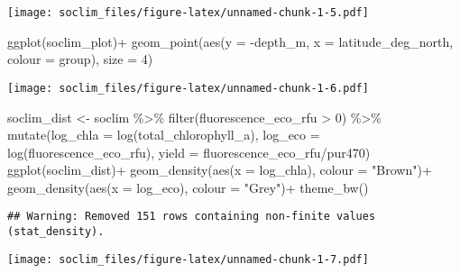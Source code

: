 \documentclass[
]{article}
\newenvironment{Shaded}{\begin{snugshade}}{\end{snugshade}}
\newcommand{\AttributeTok}[1]{\textcolor[rgb]{0.77,0.63,0.00}{#1}}
\newcommand{\DecValTok}[1]{\textcolor[rgb]{0.00,0.00,0.81}{#1}}
\newcommand{\FunctionTok}[1]{\textcolor[rgb]{0.00,0.00,0.00}{#1}}
\newcommand{\NormalTok}[1]{#1}
\newcommand{\OtherTok}[1]{\textcolor[rgb]{0.56,0.35,0.01}{#1}}
\newcommand{\SpecialCharTok}[1]{\textcolor[rgb]{0.00,0.00,0.00}{#1}}
\newcommand{\StringTok}[1]{\textcolor[rgb]{0.31,0.60,0.02}{#1}}
\begin{document}
\texttt{[image: soclim\_files/figure-latex/unnamed-chunk-1-5.pdf]}

\begin{Shaded}
\begin{Highlighting}[]
\FunctionTok{ggplot}\NormalTok{(soclim\_plot)}\SpecialCharTok{+}
  \FunctionTok{geom\_point}\NormalTok{(}\FunctionTok{aes}\NormalTok{(}\AttributeTok{y =} \SpecialCharTok{{-}}\NormalTok{depth\_m, }\AttributeTok{x =}\NormalTok{ latitude\_deg\_north, }\AttributeTok{colour =}\NormalTok{ group), }\AttributeTok{size =} \DecValTok{4}\NormalTok{)}
\end{Highlighting}
\end{Shaded}

\texttt{[image: soclim\_files/figure-latex/unnamed-chunk-1-6.pdf]}

\begin{Shaded}
\begin{Highlighting}[]
\NormalTok{soclim\_dist }\OtherTok{\textless{}{-}}\NormalTok{ soclim }\SpecialCharTok{\%\textgreater{}\%} \FunctionTok{filter}\NormalTok{(fluorescence\_eco\_rfu }\SpecialCharTok{\textgreater{}} \DecValTok{0}\NormalTok{) }\SpecialCharTok{\%\textgreater{}\%}
  \FunctionTok{mutate}\NormalTok{(}\AttributeTok{log\_chla =} \FunctionTok{log}\NormalTok{(total\_chlorophyll\_a),}
                            \AttributeTok{log\_eco =} \FunctionTok{log}\NormalTok{(fluorescence\_eco\_rfu),}
         \AttributeTok{yield =}\NormalTok{ fluorescence\_eco\_rfu}\SpecialCharTok{/}\NormalTok{pur470)}
\FunctionTok{ggplot}\NormalTok{(soclim\_dist)}\SpecialCharTok{+}
  \FunctionTok{geom\_density}\NormalTok{(}\FunctionTok{aes}\NormalTok{(}\AttributeTok{x =}\NormalTok{ log\_chla), }\AttributeTok{colour =} \StringTok{"Brown"}\NormalTok{)}\SpecialCharTok{+}
  \FunctionTok{geom\_density}\NormalTok{(}\FunctionTok{aes}\NormalTok{(}\AttributeTok{x =}\NormalTok{ log\_eco), }\AttributeTok{colour =} \StringTok{"Grey"}\NormalTok{)}\SpecialCharTok{+}
  \FunctionTok{theme\_bw}\NormalTok{()}
\end{Highlighting}
\end{Shaded}

\begin{verbatim}
## Warning: Removed 151 rows containing non-finite values (stat_density).
\end{verbatim}

\texttt{[image: soclim\_files/figure-latex/unnamed-chunk-1-7.pdf]}
\end{document}
